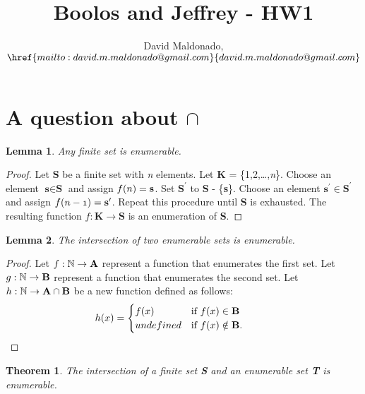 \documentclass[a4paper,11pt]{article}
\author{David Maldonado, $\href{mailto:david.m.maldonado@gmail.com}%
{david.m.maldonado@gmail.com}$}
\title{Boolos and Jeffrey - HW1}
\newtheorem{lem}{Lemma}[section]
\newtheorem{thm}{Theorem}[section]
\begin{document}
\maketitle

\bigskip


\section{A question about $\cap$} 

	\begin{lem}Any finite set is enumerable.\end{lem}
		\begin{proof}
		Let \textbf{S} be a finite set with \textit{n} elements. Let \textbf{K} = \{1,2,\dots,\textit{n}\}. 
		Choose an element $\textbf{s} \in \textbf{S}$ and assign $\mathnormal{f(n)} = \textbf{s}$. 
		Set $\textbf{S}^\prime$ to \textbf{S} - \{\textbf{s}\}. Choose an element $\textbf{s}^\prime
		\in \textbf{S}^\prime$ and assign $\mathnormal{f(n-1)} = \textbf{s}^\prime$. 
		Repeat this procedure until \textbf{S} is exhausted. The resulting function $f : \textbf{K} \rightarrow 	
		\textbf{S}$ is an enumeration of \textbf{S}.
		\end{proof}
		
		\bigskip
		
	\begin{lem}The intersection of two enumerable sets is enumerable.\end{lem}
		\begin{proof}
		Let $\mathnormal{f}: \mathbb{N} \rightarrow \textbf{A}$ represent a function that enumerates the 	first set. Let $\mathnormal{g}: \mathbb{N} \rightarrow \textbf{B}$ 
		represent a function that enumerates the second set. Let $\mathnormal{h}: \mathbb{N} \rightarrow 
		\textbf{A} \cap \textbf{B}$ be a new function defined as follows: 
		\bigskip
		\begin{equation*} \hspace*{-1cm}  h(x) = \begin{cases} f(x) &\mbox{if } f(x) \in \textbf{B} \\ 
		undefined & \mbox{if } f(x) \notin \textbf{B}. \end{cases} \end{equation*}
		\end{proof}
		
	\begin{thm}
	The intersection of a finite set \textbf{S} and an enumerable set \textbf{T} is enumerable.
	\end{thm}
	
\end{document}
